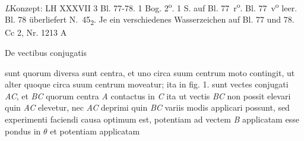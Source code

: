\vspace{-1mm}
\begin{Ueberlieferung}%
{\textit{L}}Konzept: LH XXXVII 3 Bl. 77-78. 1 Bog. 2\textsuperscript{o}. 1 S. auf Bl. 77~r\textsuperscript{o}. Bl. 77~v\textsuperscript{o} leer. Bl. 78 überliefert N.~45\textsubscript{2}.
Je ein verschiedenes Wasserzeichen auf Bl. 77 und 78.\\%
Cc 2, Nr. 1213 A
\end{Ueberlieferung}
%
%
\vspace{5.5mm}
\count{}
\count{}
\count{}
\pstart
\begin{center}De vectibus\protect{} conjugatis\end{center}
\pend
\vspace{0.3em}
\pstart
\noindent [77~r\textsuperscript{o}] 
 sunt quorum diversa sunt centra, 
et uno circa suum centrum moto contingit, ut alter  quoque circa suum centrum moveatur;  ita in fig. 1. sunt vectes\protect{} conjugati \textit{AC}, et \textit{BC} quorum centra \textit{A} contactus in \textit{C} ita ut vectis\protect{} \textit{BC} non possit elevari quin \textit{AC} elevetur, nec \textit{AC} deprimi quin \textit{BC} 
variis modis applicari possunt, sed experimenti faciendi causa  optimum est, potentiam\protect{} ad vectem\protect{}
\textit{B} applicatam esse pondus\protect{}
 in
$\theta$
et potentiam\protect{} applicatam  
